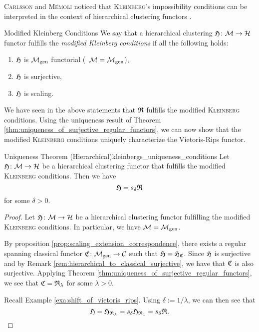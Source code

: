 \textsc{Carlsson} and \textsc{M\'emoli} noticed that \textsc{Kleinberg}'s impossibility conditions can be interpreted in the context of hierarchical clustering functors \cite[Sec.~7.3.1]{Carlsson2010}.

\begin{definition}{Modified Kleinberg Conditions \cite[Sec.~7.3.1]{Carlsson2010}}{}
    We say that a hierarchical clustering $\mathfrak{H}\colon \mathcal{M} \to \mathcal{H}$ functor fulfills the \emph{modified Kleinberg conditions} if all the following holds:
    \begin{enumerate}
        \item $\mathfrak{H}$ is ${\mathcal{M}_\mathrm{gen}}$ functorial (\ie\ $\mathcal{M} = {\mathcal{M}_\mathrm{gen}}$),
        \item $\mathfrak{H}$ is surjective,
        \item $\mathfrak{H}$ is scaling.
    \end{enumerate}
\end{definition}

We have seen in the above statements that $\mathfrak{R}$ fulfills the modified \textsc{Kleinberg} conditions.
Using the uniqueness result of Theorem \ref{thm:uniqueness_of_surjective_regular_functors}, we can now show that the modified \textsc{Kleinberg} conditions uniquely characterize the Vietoris-Rips functor.

\begin{theorem}{Uniqueness Theorem (Hierarchical)}{kleinbergs_uniqueness_conditions}
    Let $\mathfrak{H}\colon \mathcal{M} \to \mathcal{H}$ be a hierarchical clustering functor that fulfills the modified \textsc{Kleinberg} conditions. Then we have
    $$
    \mathfrak{H} = s_\delta \mathfrak{R}
    $$
    for some $\delta > 0$.
\end{theorem}

\begin{proof}
Let $\mathfrak{H}\colon \mathcal{M} \to \mathcal{H}$ be a hierarchical clustering functor fulfilling the modified \textsc{Kleinberg} conditions. In particular, we have $\mathcal{M} = {\mathcal{M}_\mathrm{gen}}$.

By proposition \ref{prop:scaling_extension_correspondence}, there exists a regular spanning classical functor ${\mathfrak{C}\colon {\mathcal{M}_\mathrm{gen}} \to \mathcal{C}}$ such that $\mathfrak{H} = \mathfrak{H}_{\mathfrak{C}}$.
Since $\mathfrak{H}$ is surjective and by Remark \ref{rem:hierarchical_to_classical_surjective}, we have that $\mathfrak{C}$ is also surjective.
Applying Theorem \ref{thm:uniqueness_of_surjective_regular_functors}, we see that $\mathfrak{C} = \mathfrak{R}_{\lambda}$ for some $\lambda > 0$.


Recall Example \ref{exa:shift_of_vietoris_rips}. Using $\delta := 1/\lambda$, we can then see that
$$
\mathfrak{H} = \mathfrak{H}_{\mathfrak{R}_\lambda} = s_\delta \mathfrak{H}_{\mathfrak{R}_1} = s_\delta \mathfrak{R}.
$$
\end{proof}
